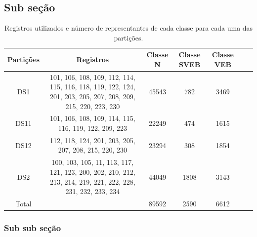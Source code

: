 \subsection{Sub seção}

\begin{table}[htb]
	\centering
	\caption{Registros utilizados e número de representantes de cada classe para cada uma das partições. }
	\begin{adjustbox}{width=1\textwidth}
		\label{tabela-particoes}
		\begin{tabular}{|c|c|c|c|c|c|c|}
			\hline
			\rowcolor[HTML]{D0D0D0}
			Partições                     & Registros                                                                                                                                              & Classe N & Classe SVEB & Classe VEB \\ \hline
			\hline      
			\cellcolor[HTML]{EFEFEF}DS1   & 101, 106, 108, 109, 112, 114, 115, 116, 118, 119, 122, 124, 201, 203, 205, 207, 208, 209, 215, 220, 223, 230 & 45543    & 782         & 3469       \\ \hline        
			\cellcolor[HTML]{EFEFEF}DS11  & 101, 106, 108, 109, 114, 115, 116, 119, 122, 209, 223                                                                                                  & 22249    & 474         & 1615       \\ \hline      
			\cellcolor[HTML]{EFEFEF}DS12  & 112, 118, 124, 201, 203, 205, 207, 208, 215, 220, 230                                                                                                  & 23294    & 308         & 1854       \\ \hline  
			\cellcolor[HTML]{EFEFEF}DS2   & 100, 103, 105, 11, 113, 117, 121, 123, 200, 202, 210, 212, 213, 214, 219, 221, 222, 228, 231, 232, 233, 234  & 44049    & 1808        & 3143       \\ \hline
			\rowcolor[HTML]{B8B8B8} 
			\cellcolor[HTML]{EFEFEF}Total &                                                                                                                                                        & 89592    & 2590        & 6612       \\ \hline
		\end{tabular}
	\end{adjustbox}
\end{table}

\subsubsection{Sub sub seção}

